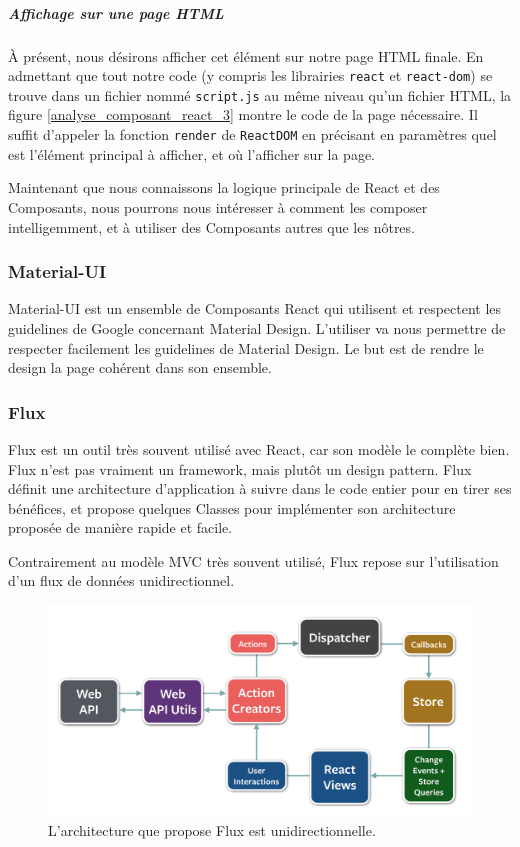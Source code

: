 			\subparagraph{Affichage sur une page HTML}

			À présent, nous désirons afficher cet élément sur notre page HTML finale. En admettant que tout notre code (y compris les librairies \texttt{react} et \texttt{react-dom}) se trouve dans un fichier nommé \texttt{script.js} au même niveau qu'un fichier HTML, la figure \ref{analyse_composant_react_3} montre le code de la page nécessaire. Il suffit d'appeler la fonction \texttt{render} de \texttt{ReactDOM} en précisant en paramètres quel est l'élément principal à afficher, et où l'afficher sur la page.

			Maintenant que nous connaissons la logique principale de React et des Composants, nous pourrons nous intéresser à comment les composer intelligemment, et à utiliser des Composants autres que les nôtres.

		\subsubsection{Material-UI}

		Material-UI\cite{material-ui} est un ensemble de Composants React qui utilisent et respectent les guidelines de Google concernant Material Design\cite{material-design-guidelines}. L'utiliser va nous permettre de respecter facilement les guidelines de Material Design. Le but est de rendre le design la page cohérent dans son ensemble.

		\subsubsection{Flux}

		Flux\cite{flux} est un outil très souvent utilisé avec React, car son modèle le complète bien.
		Flux n'est pas vraiment un framework, mais plutôt un \gls{design pattern}.
		Flux définit une architecture d'application à suivre dans le code entier pour en tirer ses bénéfices, et propose quelques Classes pour implémenter son architecture proposée de manière rapide et facile.

		Contrairement au modèle MVC très souvent utilisé, Flux repose sur l'utilisation d'un flux de données unidirectionnel.

		\begin{figure}[h]
			\centering
			\includegraphics[width=1\textwidth]{images/analyse/flux}
			\caption{L'architecture que propose Flux est unidirectionnelle.\cite{flux-github}}
			\label{flux-diagram}
		\end{figure}

